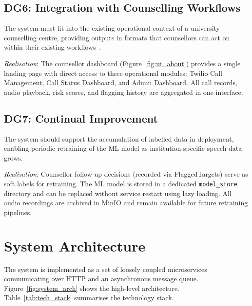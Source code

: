 \subsection{DG6: Integration with Counselling Workflows}

The system must fit into the existing operational context of a university counselling centre, providing outputs in formats that counsellors can act on within their existing workflows~\cite{Suendermann2019}.

\textit{Realisation}: The counsellor dashboard (Figure~\ref{fig:ui_about}) provides a single landing page with direct access to three operational modules: Twilio Call Management, Call Status Dashboard, and Admin Dashboard. All call records, audio playback, risk scores, and flagging history are aggregated in one interface.

\subsection{DG7: Continual Improvement}

The system should support the accumulation of labelled data in deployment, enabling periodic retraining of the ML model as institution-specific speech data grows.

\textit{Realisation}: Counsellor follow-up decisions (recorded via FlaggedTargets) serve as soft labels for retraining. The ML model is stored in a dedicated \texttt{model\_store} directory and can be replaced without service restart using lazy loading. All audio recordings are archived in MinIO and remain available for future retraining pipelines.

\section{System Architecture}

The system is implemented as a set of loosely coupled microservices communicating over HTTP and an asynchronous message queue. Figure~\ref{fig:system_arch} shows the high-level architecture. Table~\ref{tab:tech_stack} summarises the technology stack.


